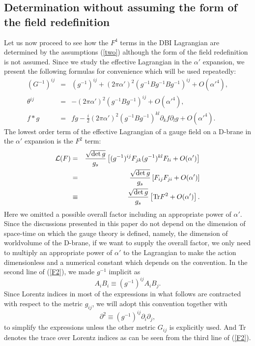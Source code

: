 \documentclass[a4paper,12pt]{article}
\begin{document}
\subsection{Determination without assuming
the form of the field redefinition}
\indent

Let us now proceed to see how the $F^4$ terms in the DBI Lagrangian
are determined by the assumptions (\ref{two})
although the form of the field redefinition is not assumed.
Since we study the effective Lagrangian
in the $\alpha'$ expansion,
we present the following formulas for convenience
which will be used repeatedly:
\begin{eqnarray}
(G^{-1})^{ij} &=& (g^{-1})^{ij}
+ (2 \pi \alpha')^2
( g^{-1} B g^{-1} B g^{-1} )^{ij}
+ O(\alpha'^4),
\label{G-expansion}
\\
\theta^{ij} &=& - (2 \pi \alpha')^2
( g^{-1} B g^{-1} )^{ij} + O(\alpha'^4), \\
f \ast g &=& fg -\frac{i}{2} (2 \pi \alpha')^2
( g^{-1} B g^{-1} )^{kl} \partial_k f \partial_l g
+ O(\alpha'^4).
\label{star-expansion}
\end{eqnarray}
The lowest order term of the effective Lagrangian of a gauge field
on a D-brane in the $\alpha'$ expansion is the $F^2$ term:
\begin{eqnarray}
{\cal L}(F) &=& \frac{\sqrt{\det g}}{g_s} \left[
(g^{-1})^{ij} F_{jk} (g^{-1})^{kl} F_{li}
+ O(\alpha') \right] \nonumber \\
&=& \frac{\sqrt{\det g}}{g_s} \left[
F_{ij} F_{ji}
+ O(\alpha') \right] \nonumber \\
&\equiv& \frac{\sqrt{\det g}}{g_s} \left[
{\rm Tr} F^2
+ O(\alpha') \right].
\label{F2}
\end{eqnarray}
Here we omitted a possible overall factor
including an appropriate power of $\alpha'$.
Since the discussions presented in this paper
do not depend on the dimension of space-time
on which the gauge theory is defined,
namely, the dimension of worldvolume of the D-brane,
if we want to supply the overall factor,
we only need to multiply an appropriate power of
$\alpha'$ to the Lagrangian to make the action
dimensionless and a numerical constant
which depends on the convention.
In the second line of (\ref{F2}),
we made $g^{-1}$ implicit as
\begin{equation}
A_i B_i \equiv (g^{-1})^{ij} A_i B_j.
\label{implicit-g-1}
\end{equation}
Since Lorentz indices in most of the expressions in what follows
are contracted with respect to the metric $g_{ij}$,
we will adopt this convention together with
\begin{equation}
\partial^2 \equiv (g^{-1})^{ij} \partial_i \partial_j,
\label{implicit-g-2}
\end{equation}
to simplify the expressions
unless the other metric $G_{ij}$ is explicitly used.
And Tr denotes the trace over Lorentz indices
as can be seen from the third line of (\ref{F2}).
\end{document}
